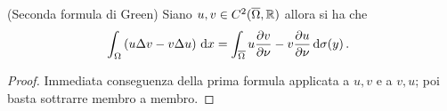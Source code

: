 \begin{corollary}(Seconda formula di Green)
	Siano $u,v\in C^2(\overline\Omega, \mathbb R)$ allora si ha che
	\[
		\int_{\Omega}\left(u\Delta v-v\Delta u\right) \,\mathrm d x=
		\int_{\overline\Omega}u\frac{\partial v}{\partial\nu}-v\frac{\partial u}{\partial\nu} \,\mathrm d \sigma(y)\, \text{. }
	\]
\end{corollary}

\begin{proof}
	Immediata conseguenza della prima formula applicata a $u,v$ e a $v,u$; poi basta sottrarre membro a membro.
\end{proof}


